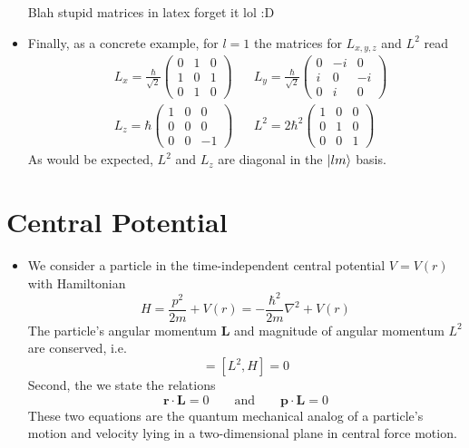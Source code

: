 \documentclass[11pt, a4paper]{article}
\renewcommand{\laplacian}{\nabla^{2}}
\newcommand{\eqtext}[1]{\qquad \text{#1} \qquad}
\newcommand{\Ham}{Hamiltonian\xspace}
\renewcommand{\vec}[1]{\bm{#1}}  %
\renewcommand{\r}{\vec{r}}  %
\renewcommand{\L}{\vec{L}}  %
\begin{document}
\begin{itemize}
	Blah stupid matrices in latex forget it lol :D
	
	\fi
	
	\item Finally, as a concrete example, for $ l = 1 $ the matrices for $ L_{x, y, z} $ and $ L^{2} $ read
	\begin{align*}
		& L_{x} = \frac{\hbar}{\sqrt{2}} 
		\begin{pmatrix}
			0 & 1 & 0\\
			1 & 0 & 1\\
			0 & 1 & 0
		\end{pmatrix}
		&&
		L_{y} = \frac{\hbar}{\sqrt{2}} 
		\begin{pmatrix}
			0 & -i & 0 \\
			i & 0 & -i \\
			0 & i & 0
		\end{pmatrix}\\
		& L_{z} = \hbar
		\begin{pmatrix}
			1 & 0 & 0\\
			0 & 0 & 0\\
			0 & 0 & -1
		\end{pmatrix}
		&&
		L^{2} = 2\hbar^{2}
		\begin{pmatrix}
			1 & 0 & 0\\
			0 & 1 & 0\\
			0 & 0 & 1
		\end{pmatrix}
	\end{align*}
	As would be expected, $ L^{2} $ and $ L_{z} $ are diagonal in the $ \ket{lm} $ basis.
	
\end{itemize}


\section{Central Potential}
\begin{itemize}
	\item We consider a particle in the time-independent central potential $ V = V(r) $ with \Ham 
	\begin{equation*}
		H = \frac{p^{2}}{2m} + V(r) = -\frac{\hbar^{2}}{2m} \laplacian + V(r)
	\end{equation*}
	The particle's angular momentum $ \L $ and magnitude of angular momentum $ L^{2} $ are conserved, i.e.
	\begin{equation*}
		[\L, H] = [L^{2}, H] = 0
	\end{equation*}
	Second, the we state the relations
	\begin{equation*}
		\r \cdot \L = 0 \eqtext{and} \vec{p} \cdot \L = 0
	\end{equation*}
	These two equations are the quantum mechanical analog of a particle's motion and velocity lying in a two-dimensional plane in central force motion.
	
\end{itemize}
\end{document}

